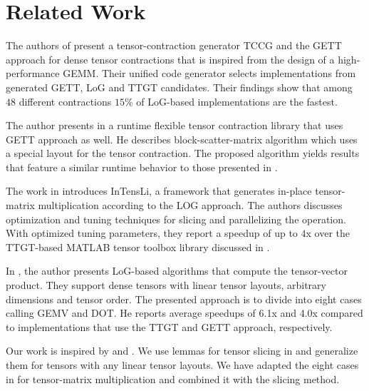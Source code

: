 \section{Related Work}
\label{sec:related}

\begin{comment}
The authors in \cite{dinapoli:2014:towards.efficient.use} discuss the efficient tensor contractions with highly optimized BLAS. 
Based on the LoG approach, they define requirements for the use of \tf{gemm} for class 3 tensor contractions and provide slicing techniques for tensors. %
The slicing recipe for the class 2 categorized tensor contractions contains a short description with a rule of thumb for maximizing performance.
Runtime measurements cover class 3 tensor contractions.
\end{comment}

The authors of \cite{springer:2018:design} present a tensor-contraction generator TCCG and the GETT approach for dense tensor contractions that is inspired from the design of a high-performance GEMM.
Their unified code generator selects implementations from generated GETT, LoG and TTGT candidates.
Their findings show that among $48$ different contractions $15$\% of LoG-based implementations are the fastest.

The author presents in \cite{matthews:2018:high} a runtime flexible tensor contraction library that uses GETT approach as well.
He describes block-scatter-matrix algorithm which uses a special layout for the tensor contraction.
The proposed algorithm yields results that feature a similar runtime behavior to those presented in \cite{springer:2018:design}.

The work in \cite{li:2015:input} introduces InTensLi, a framework that generates in-place tensor-matrix multiplication according to the LOG approach. 
The authors discusses optimization and tuning techniques for slicing and parallelizing the operation.
With optimized tuning parameters, they report a speedup of up to $4$x over the TTGT-based MATLAB tensor toolbox library discussed in \cite{bader:2006:algorithm862}.

In \cite{bassoy:2019:ttv}, the author presents LoG-based algorithms that compute the tensor-vector product. 
They support dense tensors with linear tensor layouts, arbitrary dimensions and tensor order.
The presented approach is to divide into eight cases calling GEMV and DOT.
He reports average speedups of 6.1x and 4.0x compared to implementations that use the TTGT and GETT approach, respectively.

Our work is inspired by \cite{li:2015:input} and \cite{bassoy:2019:ttv}.
We use lemmas for tensor slicing in \cite{li:2015:input} and generalize them for tensors with any linear tensor layouts. 
We have adapted the eight cases in \cite{bassoy:2019:ttv} for tensor-matrix multiplication and combined it with the slicing method.